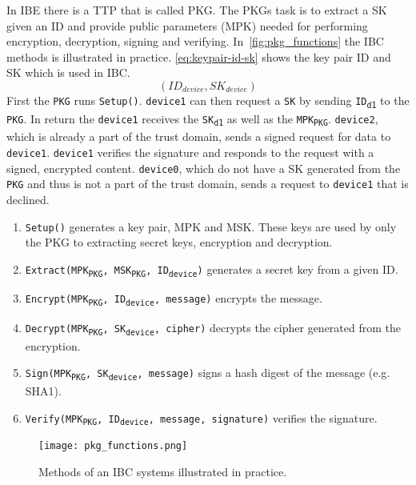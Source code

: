 In \gls{IBE} there is a \gls{TTP} that is called \gls{PKG}.
The \gls{PKG}s task is to extract a \gls{SK} given an \gls{ID} and provide public parameters (\gls{MPK}) needed for performing encryption, decryption, signing and verifying. In~\autoref{fig:pkg_functions} the \gls{IBC} methods is illustrated in practice. 
\autoref{eq:keypair-id-sk} shows the key pair \gls{ID} and \gls{SK} which is used in \gls{IBC}.
\begin{equation}\label{eq:keypair-id-sk}
(ID_{device}, SK_{device})
\end{equation}
First the \texttt{PKG} runs \texttt{Setup()}. 
\texttt{device1} can then request a \texttt{SK} by sending \texttt{ID\textsubscript{d1}} to the \texttt{PKG}. 
In return the \texttt{device1} receives the \texttt{SK\textsubscript{d1}} as well as the \texttt{MPK\textsubscript{PKG}}.
\texttt{device2}, which is already a part of the trust domain, sends a signed request for \gls{data} to \texttt{device1}. 
\texttt{device1} verifies the signature and responds to the request with a signed, encrypted content.
\texttt{device0}, which do not have a \gls{SK} generated from the \texttt{PKG} and thus is not a part of the trust domain, sends a request to \texttt{device1} that is declined.

\begin{enumerate}\label{ibc-methods}
  \item \texttt{Setup()} generates a key pair, \gls{MPK} and \gls{MSK}. 
  These keys are used by only the \gls{PKG} to extracting secret keys, encryption and decryption.
  \item \texttt{Extract(MPK\textsubscript{PKG}, MSK\textsubscript{PKG}, ID\textsubscript{device})} generates a secret key from a given ID. 
  \item \texttt{Encrypt(MPK\textsubscript{PKG}, ID\textsubscript{device}, message)} encrypts the message.
  \item \texttt{Decrypt(MPK\textsubscript{PKG}, SK\textsubscript{device}, cipher)} decrypts the cipher generated from the encryption.
  \item \texttt{Sign(MPK\textsubscript{PKG}, SK\textsubscript{device}, message)} signs a hash digest of the message (e.g. \gls{SHA1}).
  \item \texttt{Verify(MPK\textsubscript{PKG}, ID\textsubscript{device}, message, signature)} verifies the signature.
\end{enumerate}

\begin{figure}[ht]
  \centering
  \texttt{[image: pkg\_functions.png]}
  \caption[IBC methods]{Methods of an IBC systems illustrated in practice.}
  \label{fig:pkg_functions}
\end{figure}

